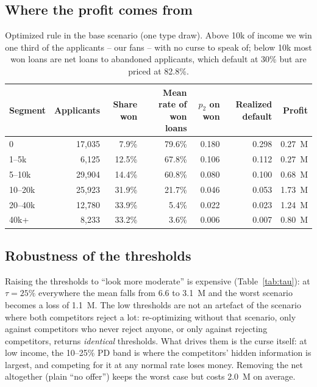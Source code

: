 \documentclass[11pt,a4paper]{article}
\newcommand{\meur}{M\texteuro}
\begin{document}
\subsection{Where the profit comes from}
\begin{table}[h]\centering\small
\begin{tabular}{lrrrrrr}
\toprule
Segment & Applicants & Share won & Mean rate of won loans & $\hat p_2$ on won & Realized default & Profit\\
\midrule
0       & 17,035 &  7.9\% & 79.6\% & 0.180 & 0.298 & 0.27~\meur{}\\
1--5k   &  6,125 & 12.5\% & 67.8\% & 0.106 & 0.112 & 0.27~\meur{}\\
5--10k  & 29,904 & 14.4\% & 60.8\% & 0.080 & 0.100 & 0.68~\meur{}\\
10--20k & 25,923 & 31.9\% & 21.7\% & 0.046 & 0.053 & 1.73~\meur{}\\
20--40k & 12,780 & 33.9\% &  5.4\% & 0.022 & 0.023 & 1.24~\meur{}\\
40k+    &  8,233 & 33.2\% &  3.6\% & 0.006 & 0.007 & 0.80~\meur{}\\
\bottomrule
\end{tabular}
\caption{Optimized rule in the base scenario (one type draw). Above 10k of income we win one third of the
applicants -- our fans -- with no curse to speak of; below 10k most won loans are net loans to abandoned
applicants, which default at 30\% but are priced at 82.8\%.}
\label{tab:segments}
\end{table}

\subsection{Robustness of the thresholds}
Raising the thresholds to ``look more moderate'' is expensive (Table~\ref{tab:tau}): at $\tau = 25\%$ everywhere
the mean falls from 6.6 to 3.1~\meur{} and the worst scenario becomes a loss of 1.1~\meur{}. The low thresholds
are not an artefact of the scenario where both competitors reject a lot: re-optimizing without that scenario, only
against competitors who never reject anyone, or only against rejecting competitors, returns \emph{identical}
thresholds. What drives them is the curse itself: at low income, the 10--25\% PD band is where the competitors'
hidden information is largest, and competing for it at any normal rate loses money. Removing the net altogether
(plain ``no offer'') keeps the worst case but costs 2.0~\meur{} on average.
\end{document}

